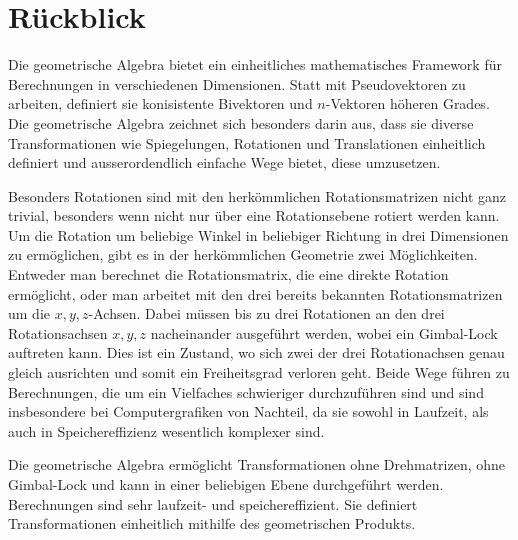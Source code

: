 \section{Rückblick}
%
Die geometrische Algebra bietet ein einheitliches mathematisches Framework für Berechnungen
in verschiedenen Dimensionen. Statt mit Pseudovektoren zu arbeiten, definiert sie konisistente
Bivektoren und $n$-Vektoren höheren Grades. Die geometrische Algebra zeichnet sich besonders
darin aus, dass sie diverse Transformationen wie Spiegelungen, Rotationen und Translationen
einheitlich definiert und ausserordendlich einfache Wege bietet, diese umzusetzen.

Besonders Rotationen sind mit den herkömmlichen Rotationsmatrizen nicht ganz trivial, besonders wenn
nicht nur über eine Rotationsebene rotiert werden kann. Um die Rotation um beliebige Winkel in beliebiger
Richtung in drei Dimensionen zu ermöglichen, gibt es in der herkömmlichen Geometrie zwei Möglichkeiten. Entweder
man berechnet die Rotationsmatrix, die eine direkte Rotation ermöglicht, oder man arbeitet mit den drei bereits bekannten
Rotationsmatrizen um die $x, y, z$-Achsen. Dabei müssen bis zu drei
Rotationen an den drei Rotationsachsen $x, y, z$ nacheinander ausgeführt werden, wobei ein
Gimbal-Lock
%
\cite{geoalgebra:gimbal-lock}
auftreten kann. Dies ist ein Zustand, wo sich zwei der drei Rotationachsen genau gleich ausrichten und somit ein Freiheitsgrad verloren geht.
Beide Wege führen zu Berechnungen, die um ein Vielfaches
schwieriger durchzuführen sind und sind insbesondere bei Computergrafiken von Nachteil, da sie sowohl in Laufzeit,
als auch in Speichereffizienz wesentlich komplexer sind.

Die geometrische Algebra ermöglicht Transformationen ohne Drehmatrizen, ohne Gim\-bal-Lock und kann in einer beliebigen
Ebene durchgeführt werden. Berechnungen sind sehr laufzeit- und speichereffizient.
Sie definiert Transformationen einheitlich mithilfe des geometrischen Produkts.
